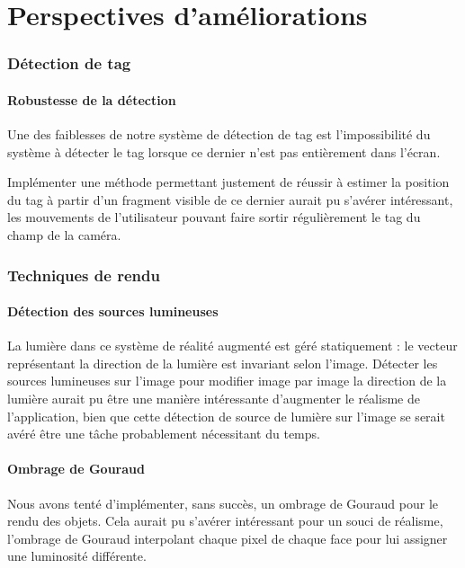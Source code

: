 \part{Perspectives d'améliorations}
\label{part:ameliorations}

\section{Détection de tag}

    \subsection{Robustesse de la détection}

    Une des faiblesses de notre système de détection de tag est l'impossibilité du système à détecter le tag lorsque ce dernier n'est pas entièrement dans l'écran.

    Implémenter une méthode permettant justement de réussir à estimer la position du tag à partir d'un fragment visible de ce dernier aurait pu s'avérer intéressant, les mouvements de l'utilisateur pouvant faire sortir régulièrement le tag du champ de la caméra.

\section{Techniques de rendu}

    \subsection{Détection des sources lumineuses}

    La lumière dans ce système de réalité augmenté est géré statiquement : le vecteur représentant la direction de la lumière est invariant selon l'image.
    Détecter les sources lumineuses sur l'image pour modifier image par image la direction de la lumière aurait pu être une manière intéressante d'augmenter le réalisme de l'application, bien que cette détection de source de lumière sur l'image se serait avéré être une tâche probablement nécessitant du temps.

    \subsection{Ombrage de Gouraud}

    Nous avons tenté d'implémenter, sans succès, un ombrage de Gouraud pour le rendu des objets. Cela aurait pu s'avérer intéressant pour un souci de réalisme, l'ombrage de Gouraud interpolant chaque pixel de chaque face pour lui assigner une luminosité différente.

